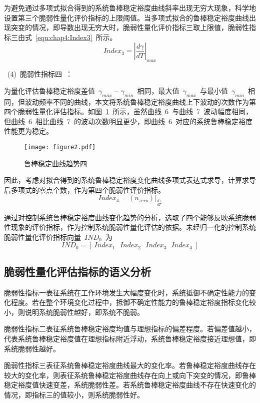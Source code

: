 为避免通过多项式拟合得到的系统鲁棒稳定裕度曲线斜率出现无穷大现象，科学地设置第三个脆弱性量化评价指标的上限阈值。当多项式拟合的鲁棒稳定裕度曲线出现突变的情况，即导数出现无穷大时，脆弱性量化评价指标三取上限值，脆弱性指标三由式~\ref{equ:chap4:Index3}~所示。
\begin{equation}\label{equ:chap4:Index3}
  Index_3=\left\vert\frac{d\gamma}{dT}\right\vert_{max}
\end{equation}

~(4)~脆弱性指标四~：

为量化评估鲁棒稳定裕度差值~$\gamma_{max}-\gamma_{min}$~相同，最大值~$\gamma_{max}$~与最小值~$\gamma_{min}$~相同，但波动频率不同的曲线，本文将系统鲁棒稳定裕度曲线上下波动的次数作为第四个脆弱性量化评估指标。如图~\ref{fig:chap4:fig4.4}~所示，虽然曲线~6~与曲线~7~波动幅度相同，但曲线~6~相比曲线~7~的波动次数明显更少，即曲线~6~对应的系统鲁棒稳定裕度性能更为稳定。
\begin{figure}[h]
\centering
\texttt{[image: figure2.pdf]}
\caption{鲁棒稳定曲线趋势四}
\label{fig:chap4:fig4.4}
\end{figure}

因此，考虑对拟合得到的系统鲁棒稳定裕度变化曲线多项式表达式求导，计算求导后多项式的零点个数，作为第四个脆弱性评价指标。
\begin{equation}\label{equ:chap4:Index4}
  Index_4=\left(n_{zero}\right)\vert_{\frac{d\gamma}{dT}}
\end{equation}

通过对控制系统鲁棒稳定裕度曲线变化趋势的分析，选取了四个能够反映系统脆弱性现象的评价指标，作为控制系统脆弱性量化评估的依据。未经归一化的控制系统脆弱性量化评价指标向量~$IND_0$~为
\begin{equation}\label{equ:chap4:Index5}
  IND_0=\left[~Index_1~~~Index_2~~~Index_3~~~Index_4~\right]
\end{equation}
\subsection{脆弱性量化评估指标的语义分析}
\label{sub:chap4:Fragility_semantic}
脆弱性指标一表征系统在工作环境发生大幅度变化时，系统抵御不确定性能力的变化程度。若在整个环境变化过程中，抵御不确定性能力的鲁棒稳定裕度指标变化较小，则说明系统脆弱性越好，即系统不脆弱。

脆弱性指标二表征系统鲁棒稳定裕度均值与理想指标的偏差程度。若偏差值越小，代表系统鲁棒稳定裕度值在理想指标附近浮动，系统鲁棒稳定裕度接近理想值，即系统脆弱性越好。

脆弱性指标三表征系统鲁棒稳定裕度曲线最大的变化率。若鲁棒稳定裕度曲线存在较大的变化率，则表征系统鲁棒稳定裕度曲线存在向上或向下突变的情况，即鲁棒稳定裕度值快速变差，系统脆弱性差。若系统鲁棒稳定裕度曲线不存在快速变化的情况，即指标三的值较小，则系统脆弱性好。

